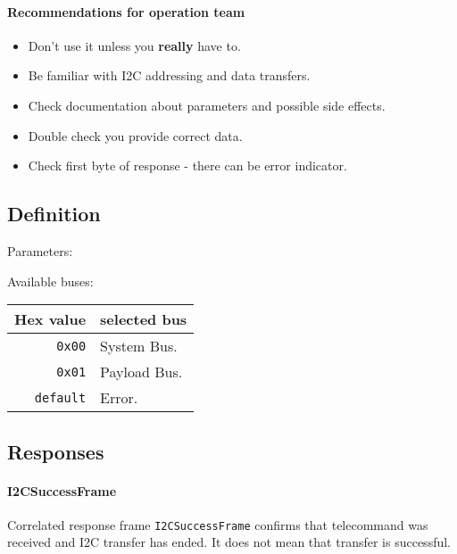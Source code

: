 \paragraph{Recommendations for operation team}
\begin{itemize}
    \item Don't use it unless you \textbf{really} have to.
    \item Be familiar with I2C addressing and data transfers.
    \item Check documentation about parameters and possible side effects.
	\item Double check you provide correct data.
	\item Check first byte of response - there can be error indicator.
\end{itemize}

\subsection{Definition}

Parameters: 

\begin{tcarglist}
\end{tcarglist}

Available buses:

\begin{tabular}{r | l}
	Hex value & selected bus \\ \hline
	\texttt{0x00} & System Bus. \\
	\texttt{0x01} & Payload Bus. \\
	\texttt{default} & Error. 
\end{tabular}

\subsection{Responses}

\paragraph{I2CSuccessFrame}
Correlated response frame \texttt{I2CSuccessFrame} confirms that telecommand was received and I2C transfer has ended. It does not mean that transfer is successful.

